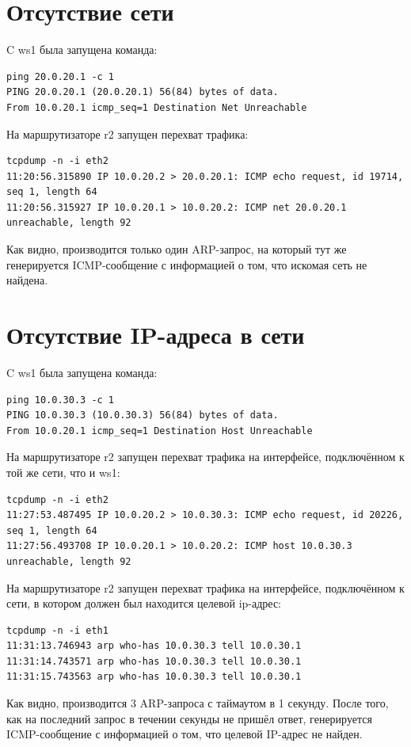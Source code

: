 \documentclass[a4paper,12pt]{article}
\begin{document}
\section{Отсутствие сети}

C ws1 была запущена команда:

\begin{Verbatim}
ping 20.0.20.1 -c 1
PING 20.0.20.1 (20.0.20.1) 56(84) bytes of data.
From 10.0.20.1 icmp_seq=1 Destination Net Unreachable
\end{Verbatim}


 На маршрутизаторе r2 запущен перехват трафика:

\begin{Verbatim}
tcpdump -n -i eth2
11:20:56.315890 IP 10.0.20.2 > 20.0.20.1: ICMP echo request, id 19714, seq 1, length 64
11:20:56.315927 IP 10.0.20.1 > 10.0.20.2: ICMP net 20.0.20.1 unreachable, length 92
\end{Verbatim}

Как видно, производится только один ARP-запрос, на который тут же генерируется ICMP-сообщение с информацией о том, что искомая сеть не найдена.

\section{Отсутствие IP-адреса в сети}

C ws1 была запущена команда:

\begin{Verbatim}
ping 10.0.30.3 -c 1
PING 10.0.30.3 (10.0.30.3) 56(84) bytes of data.
From 10.0.20.1 icmp_seq=1 Destination Host Unreachable
\end{Verbatim}


На маршрутизаторе r2 запущен перехват трафика на интерфейсе, подключённом к той же сети, что и ws1:

\begin{Verbatim}
tcpdump -n -i eth2
11:27:53.487495 IP 10.0.20.2 > 10.0.30.3: ICMP echo request, id 20226, seq 1, length 64
11:27:56.493708 IP 10.0.20.1 > 10.0.20.2: ICMP host 10.0.30.3 unreachable, length 92
\end{Verbatim}

 На маршрутизаторе r2 запущен перехват трафика на интерфейсе, подключённом к сети, в котором должен был находится целевой ip-адрес:

\begin{Verbatim}
tcpdump -n -i eth1
11:31:13.746943 arp who-has 10.0.30.3 tell 10.0.30.1
11:31:14.743571 arp who-has 10.0.30.3 tell 10.0.30.1
11:31:15.743563 arp who-has 10.0.30.3 tell 10.0.30.1
\end{Verbatim}

Как видно, производится 3 ARP-запроса с таймаутом в 1 секунду. После того, как на последний запрос в течении секунды не пришёл ответ, 
генерируется ICMP-сообщение с информацией о том, что целевой IP-адрес не найден.
\end{document}
